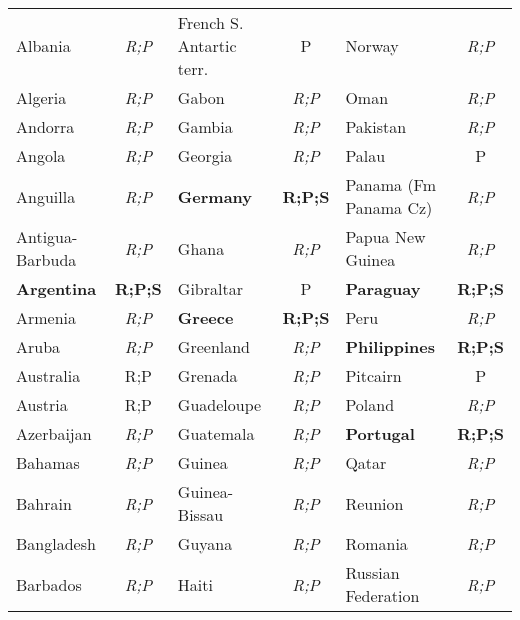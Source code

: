 \documentclass[12pt,twoside,a4paper,notitlepage]{article}
\begin{document}
{\begin{table}
\begin{tabular}{|l|c|l|c|l|c|}
   Albania &  {\it R;P} & French S. Antartic terr. &          P &     Norway &  {\it R;P} \\

   Algeria &  {\it R;P} &      Gabon &  {\it R;P} &       Oman &  {\it R;P} \\

   Andorra &  {\it R;P} &     Gambia &  {\it R;P} &   Pakistan &  {\it R;P} \\

    Angola &  {\it R;P} &    Georgia &  {\it R;P} &      Palau &          P \\

  Anguilla &  {\it R;P} &   \bf Germany &  {\bf R;P;S} &     Panama (Fm Panama Cz) &  {\it R;P} \\

Antigua-Barbuda &  {\it R;P} &     Ghana &  {\it R;P} & Papua New Guinea &  {\it R;P} \\

 \bf Argentina &  {\bf R;P;S} &  Gibraltar &          P &  \bf Paraguay &  {\bf R;P;S} \\

   Armenia &  {\it R;P} &  \bf Greece &  {\bf R;P;S} &       Peru &  {\it R;P} \\

     Aruba &  {\it R;P} &  Greenland &  {\it R;P} & \bf Philippines &  {\bf R;P;S} \\

 Australia &  { R;P} &    Grenada &  {\it R;P} &   Pitcairn &          P \\

   Austria &  { R;P} & Guadeloupe &  {\it R;P} &     Poland &  {\it R;P} \\

Azerbaijan &  {\it R;P} &  Guatemala &  {\it R;P} &  \bf Portugal &  {\bf R;P;S} \\

   Bahamas &  {\it R;P} &     Guinea &  {\it R;P} &      Qatar &  {\it R;P} \\

   Bahrain &  {\it R;P} & Guinea-Bissau &  {\it R;P} &    Reunion &  {\it R;P} \\

Bangladesh &  {\it R;P} &     Guyana &  {\it R;P} &    Romania &  {\it R;P} \\

  Barbados &  {\it R;P} &      Haiti &  {\it R;P} & Russian Federation &  {\it R;P} \\


\end{tabular}
\end{table}}
\end{document}
